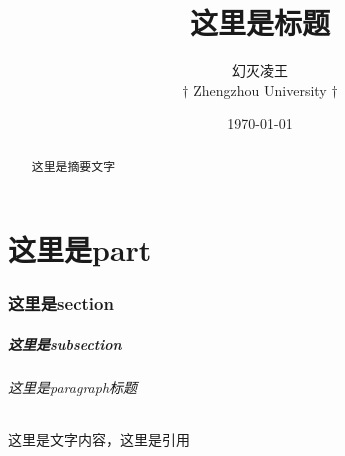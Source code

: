 \documentclass[UTF8,11pt,titlepage,a4paper]{ctexart}
\title{这里是标题}
\date{\today}
\author{ 幻灭凌王\\ 
	$ \dagger $ Zhengzhou University $ \dagger $}
\begin{document}
                                      
   \maketitle
   	\begin{abstract}
   	这里是摘要文字
   \end{abstract} 
	\setcounter{tocdepth}{4}
	\tableofcontents
	\newpage
\part{这里是part}
\section{这里是section}
\subsubsection{这里是subsection}
\paragraph{这里是paragraph标题}这里是文字内容，这里是引用 \cite{AndersonMore}


\end{document}
